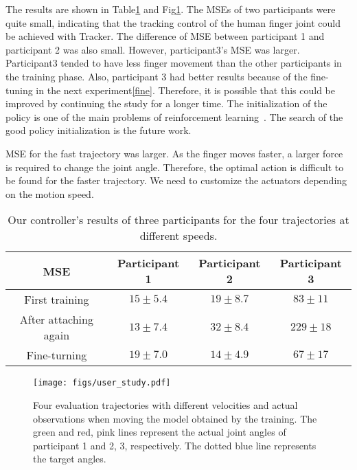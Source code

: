 \documentclass[letterpaper, 10 pt, conference]{ieeeconf}  %
\begin{document}
The results are shown in Table\ref{tab:finger} and Fig\ref{fig:re}. 
The MSEs of two participants were quite small, indicating that the tracking control of the human finger joint could be achieved with Tracker. The difference of MSE between participant 1 and participant 2 was also small. However, participant3's MSE was larger. Participant3 tended to have less finger movement than the other participants in the training phase. Also, participant 3 had better results because of the fine-tuning in the next experiment\ref{fine}. Therefore, it is possible that this could be improved by continuing the study for a longer time. The initialization of the policy is one of the main problems of reinforcement learning~\cite{andrychowicz2020matters}. The search of the good policy initialization is the future work.

MSE for the fast trajectory was larger. As the finger moves faster, a larger force is required to change the joint angle. Therefore, the optimal action is difficult to be found for the faster trajectory. We need to customize the actuators depending on the motion speed.

\begin{table}[tb]
    \centering
    \caption{Our controller's results of three participants for the four trajectories at different speeds.}
    \begin{tabular}{c|c|c|c}\hline
         MSE & Participant 1 & Participant 2 & Participant 3 \\\hline\hline
         First training & $15\pm 5.4$ & $19\pm 8.7$ & $83\pm 11$\\
        \hline
        After attaching again & $13\pm 7.4$& $32\pm 8.4$& $229\pm 18$\\
        \hline
        Fine-turning & $19\pm 7.0$& $14\pm 4.9$& $67\pm17 $\\
        \hline
    \end{tabular}
    \label{tab:finger}
\end{table}

\begin{figure}[tb]
\begin{center}
    \texttt{[image: figs/user\_study.pdf]}
    \caption{Four evaluation trajectories with different velocities and actual observations when moving the model obtained by the training. The green and red, pink lines represent the actual joint angles of participant 1 and 2, 3, respectively. The dotted blue line represents the target angles.}
    \label{fig:re}
\end{center}
\end{figure}
\end{document}
